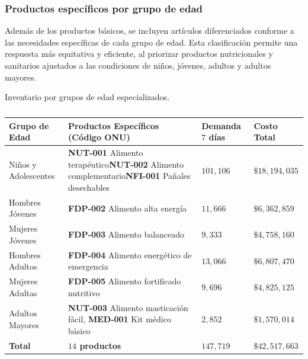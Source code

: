 \documentclass[
  spanish,
  us-letterpaper,
  DIV=11,
  numbers=noendperiod]{scrreprt}
\numberwithin{equation}{section}
\begin{document}
\subsubsection{Productos específicos por grupo de
edad}\label{productos-especuxedficos-por-grupo-de-edad}

Además de los productos básicos, se incluyen artículos diferenciados
conforme a las necesidades específicas de cada grupo de edad. Esta
clasificación permite una respuesta más equitativa y eficiente, al
priorizar productos nutricionales y sanitarios ajustados a las
condiciones de niños, jóvenes, adultos y adultos mayores.

Inventario por grupos de edad especializados.

\begin{longtable}[]{@{}
  >{\centering\arraybackslash}p{}
  >{\centering\arraybackslash}p{}
  >{\centering\arraybackslash}p{}
  >{\centering\arraybackslash}p{}@{}}

\caption{\label{tbl-inventario-especializado}}

\tabularnewline

\toprule\noalign{}
\begin{minipage}[b]{\linewidth}\centering
\textbf{Grupo de Edad}
\end{minipage} & \begin{minipage}[b]{\linewidth}\centering
\textbf{Productos Específicos (Código ONU)}
\end{minipage} & \begin{minipage}[b]{\linewidth}\centering
\textbf{Demanda \(7\) días}
\end{minipage} & \begin{minipage}[b]{\linewidth}\centering
\textbf{Costo Total}
\end{minipage} \\
\midrule\noalign{}
\endhead
\bottomrule\noalign{}
\endlastfoot
Niños y Adolescentes & \textbf{NUT-001} Alimento
terapéutico\textbf{NUT-002} Alimento complementario\textbf{NFI-001}
Pañales desechables & \(101,106\) & \(\$18,194,035\) \\
Hombres Jóvenes & \textbf{FDP-002} Alimento alta energía & \(11,666\) &
\(\$6,362,859\) \\
Mujeres Jóvenes & \textbf{FDP-003} Alimento balanceado & \(9,333\) &
\(\$4,758,160\) \\
Hombres Adultos & \textbf{FDP-004} Alimento energético de emergencia &
\(13,066\) & \(\$6,807,470\) \\
Mujeres Adultas & \textbf{FDP-005} Alimento fortificado nutritivo &
\(9,696\) & \(\$4,825,125\) \\
Adultos Mayores & \textbf{NUT-003} Alimento masticación fácil,
\textbf{MED-001} Kit médico básico & \(2,852\) & \(\$1,570,014\) \\
\textbf{Total} & \textbf{\(14\) productos} & \textbf{\(147,719\)} &
\textbf{\(\$42,517,663\)} \\

\end{longtable}
\end{document}
